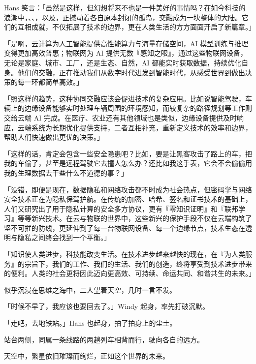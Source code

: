 Hans 笑言：「虽然是这样，但幻想将来不也是一件美好的事情吗？在如今科技的浪潮中，\hyperref[cha:bring-intelligence-to-machines]{}、\hyperref[cha:introduction-to-cryptology]{}、\hyperref[cha:program-and-arch]{}，以及\hyperref[cha:cloud-computing-and-iot]{}，正撼动着各自原本封闭的孤岛，交融成为一块整体的大陆。它们的互相成就，不仅拓展了技术的边界，更在人类生活的方方面面开启了新篇章。」

「是啊，云计算为人工智能提供高性能算力与海量存储空间，AI 模型训练与推理变得更加高效普惠；物联网为 AI 提供无数『感知之眼』，通过这些物联网设备，无论是家庭、城市、工厂，还是生态、自然，AI 都能实时获取数据，持续优化自身。他们的交融，正在推动我们从数字时代进发到智能时代，从感受世界到做出决策的每一环都简单高效。」

「照这样的趋势，这种协同交融应该会促进技术的复杂应用。比如说智能驾驶，车辆上的边缘设备能够实时处理车辆周围的环境感知，而较复杂的路径规划等工作则交给云端 AI 完成。在医疗、农业还有其他领域也是类似，边缘设备提供及时响应，云端系统为长期优化提供支持，二者互相补充，重新定义技术的效率和边界，帮助人们快速做出更优的决策。」

「这样的话，肯定会包含一些安全隐患吧？比如，要是让黑客攻击了路上的车，把我的车偷了，甚至是远程驾驶它去撞人怎么办？还比如我这手表，它会不会偷偷用我的生理数据去干些什么不道德的事？」

「没错，即便是现在，数据隐私和网络攻击都不时成为社会热点，但密码学与网络安全技术正在为隐私保驾护航。在传统的加密、哈希、签名和证书技术的基础上，人们又研究出了用于隐私计算的安全多方协议，更有『零知识证明』和『联邦学习』等等新兴技术。在云与物联的世界中，这些新兴的保护手段不仅在云端构筑了坚不可摧的防线，更延伸到了每一台物联网设备、每一个边缘节点，技术生态在透明与隐私之间终会找到一个平衡。」

「知识使人类进步，科技能改变生活。在技术进步越来越快的现在，在『为人类服务』的宗旨下，我们的工作、我们的生活、我们的创造，终将享受到技术进步带来的便利。人类的社会更将因此迈向更高效、可持续、命运共同、和谐共生的未来。」

似乎沉浸在思维之海中，二人望着天空，几时一言不发。

「时候不早了，我应该也要回去了。」Windy 起身，率先打破沉默。

「走吧，去地铁站。」Hans 也起身，拍了拍身上的尘土。

站台两侧，同属一条线路的两趟列车相背而行，驶向各自的远方。

天空中，繁星依旧璀璨而绚烂，正如这个世界的未来。

